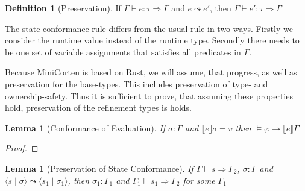 \documentclass{book}
\newcommand{\tuple}[2]{\langle #1 \mid #2 \rangle}
\newcommand{\bbracket}[1]{\llbracket #1 \rrbracket}
\newtheorem{lemma}[theorem]{Lemma}
\theoremstyle{definition}
\newtheorem{definition}[theorem]{Definition}
\begin{document}
\begin{definition}[Preservation]
  If $\Gamma \vdash e : \tau \Rightarrow \Gamma$ and $e \leadsto e'$, then $\Gamma \vdash e' : \tau \Rightarrow \Gamma$
\end{definition}

The state conformance rule differs from the usual rule in two ways. Firstly we consider the runtime value instead of the runtime type. Secondly there needs to be one set of variable assignments that satisfies all predicates in $\Gamma$.

Because MiniCorten is based on Rust, we will assume, that progress, as well as preservation for the base-types. This includes preservation of type- and ownership-safety. Thus it is sufficient to prove, that assuming these properties hold, preservation of the refinement types is holds.


\begin{lemma}[Conformance of Evaluation]
  If $\sigma : \Gamma$ and $\bbracket{e} \sigma = v$ then $\vDash \varphi \to \bbracket{e} \Gamma$ 
\end{lemma}
\begin{proof}
  
\end{proof}


\begin{lemma}[Preservation of State Conformance]
  If $\Gamma \vdash s \Rightarrow \Gamma_2$, $\sigma : \Gamma$ and $\tuple{s}{\sigma} \leadsto \tuple{s_1}{\sigma_1}$, then  $\sigma_1 : \Gamma_1$ and $\Gamma_1 \vdash s_1 \Rightarrow \Gamma_2$ for some $\Gamma_1$
\end{lemma}
\end{document}
